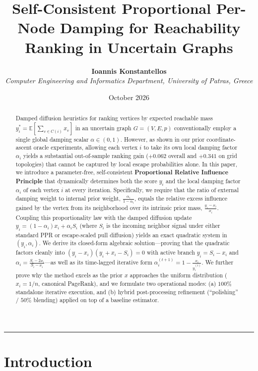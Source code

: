 \documentclass[11pt, a4paper]{article}
\title{\textbf{Self-Consistent Proportional Per-Node Damping for Reachability Ranking in Uncertain Graphs}}
\author{\textbf{Ioannis Konstantellos} \\ \textit{Computer Engineering and Informatics Department, University of Patras, Greece}}
\date{October 2026}
\begin{document}
\maketitle

\begin{abstract}
Damped diffusion heuristics for ranking vertices by expected reachable mass $y^*_i = \mathbb{E}[\sum_{v \in C(i)} x_v]$ in an uncertain graph $G=(V,E,p)$ conventionally employ a single global damping scalar $\alpha \in (0,1)$. However, as shown in our prior coordinate-ascent oracle experiments, allowing each vertex $i$ to take its own local damping factor $\alpha_i$ yields a substantial out-of-sample ranking gain ($+0.062$ overall and $+0.341$ on grid topologies) that cannot be captured by local escape probabilities alone. In this paper, we introduce a parameter-free, self-consistent \textbf{Proportional Relative Influence Principle} that dynamically determines both the score $y_i$ and the local damping factor $\alpha_i$ of each vertex $i$ at every iteration. Specifically, we require that the ratio of external damping weight to internal prior weight, $\frac{\alpha_i}{1 - \alpha_i}$, equals the relative excess influence gained by the vertex from its neighborhood over its intrinsic prior mass, $\frac{y_i - x_i}{x_i}$. Coupling this proportionality law with the damped diffusion update $y_i = (1 - \alpha_i) x_i + \alpha_i S_i$ (where $S_i$ is the incoming neighbor signal under either standard PPR or escape-scaled pull diffusion) yields an exact quadratic system in $(y_i, \alpha_i)$. We derive its closed-form algebraic solution---proving that the quadratic factors cleanly into $(y_i - x_i)(y_i + x_i - S_i) = 0$ with active branch $y_i = S_i - x_i$ and $\alpha_i = \frac{S_i - 2x_i}{S_i - x_i}$---as well as its time-lagged iterative form $\alpha_i^{(t+1)} = 1 - \frac{x_i}{y_i^{(t)}}$. We further prove why the method excels as the prior $x$ approaches the uniform distribution ($x_i = 1/n$, canonical PageRank), and we formulate two operational modes: (a) $100\%$ standalone iterative execution, and (b) hybrid post-processing refinement (``polishing'' / $50\%$ blending) applied on top of a baseline estimator.
\end{abstract}

\vspace{0.3cm}
\hrule
\vspace{0.3cm}

\section{Introduction}
\end{document}
